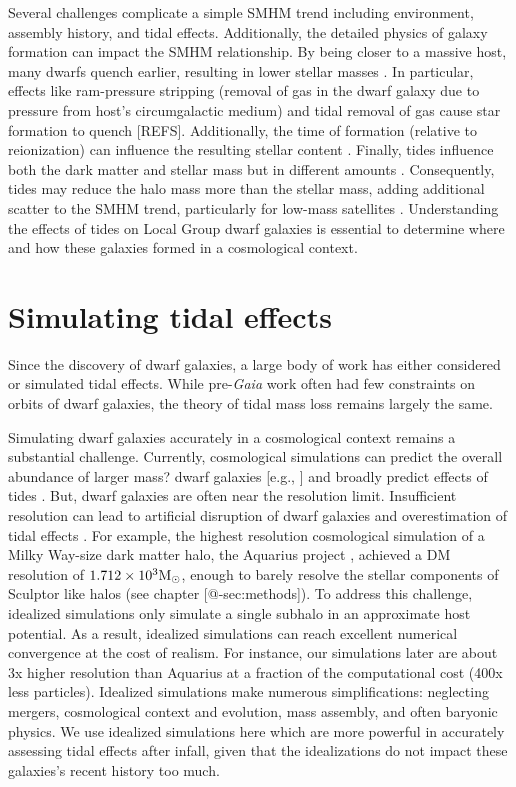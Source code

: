 Several challenges complicate a simple SMHM trend including environment,
assembly history, and tidal effects. Additionally, the detailed physics
of galaxy formation can impact the SMHM relationship. By being closer to
a massive host, many dwarfs quench earlier, resulting in lower stellar
masses \citep[e.g.,][]{christensen+2024}. In particular, effects like
ram-pressure stripping (removal of gas in the dwarf galaxy due to
pressure from host's circumgalactic medium) and tidal removal of gas
cause star formation to quench {[}REFS{]}. Additionally, the time of
formation (relative to reionization) can influence the resulting stellar
content \citep{kim+2024}. Finally, tides influence both the dark matter
and stellar mass but in different amounts \citep[e.g.,][]{PNM2008}.
Consequently, tides may reduce the halo mass more than the stellar mass,
adding additional scatter to the SMHM trend, particularly for low-mass
satellites \citep[e.g.,][]{fattahi+2018}. Understanding the effects of
tides on Local Group dwarf galaxies is essential to determine where and
how these galaxies formed in a cosmological context.

\section{Simulating tidal effects}\label{sec:tidal_theory}

Since the discovery of dwarf galaxies, a large body of work has either
considered or simulated tidal effects. While pre-\emph{Gaia} work often
had few constraints on orbits of dwarf galaxies, the theory of tidal
mass loss remains largely the same.

Simulating dwarf galaxies accurately in a cosmological context remains a
substantial challenge. Currently, cosmological simulations can predict
the overall abundance of larger mass? dwarf galaxies {[}e.g., {]} and
broadly predict effects of tides \citep[e.g.,][]{riley+2024}. But, dwarf
galaxies are often near the resolution limit. Insufficient resolution
can lead to artificial disruption of dwarf galaxies and overestimation
of tidal effects \citep[e.g.,][]{santos-santos+2025}. For example, the
highest resolution cosmological simulation of a Milky Way-size dark
matter halo, the Aquarius project \citep{springel+2008}, achieved a DM
resolution of \(1.712 \times10^3 {\rm M}_{\odot}\), enough to barely resolve the
stellar components of Sculptor like halos (see chapter
{[}@-sec:methods{]}). To address this challenge, idealized simulations
only simulate a single subhalo in an approximate host potential. As a
result, idealized simulations can reach excellent numerical convergence
at the cost of realism. For instance, our simulations later are about 3x
higher resolution than Aquarius at a fraction of the computational cost
(400x less particles). Idealized simulations make numerous
simplifications: neglecting mergers, cosmological context and evolution,
mass assembly, and often baryonic physics. We use idealized simulations
here which are more powerful in accurately assessing tidal effects after
infall, given that the idealizations do not impact these galaxies's
recent history too much.

